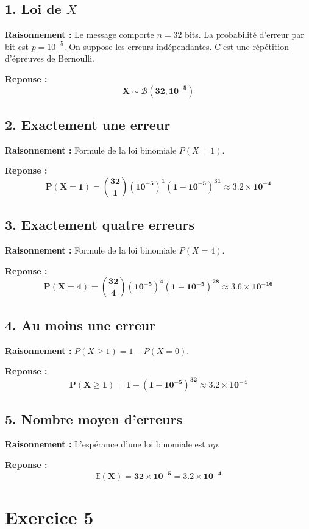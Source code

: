\documentclass[11pt,a4paper]{article}
\begin{document}
\subsection*{1. Loi de $X$}

\textbf{Raisonnement :} Le message comporte $n=32$ bits. La probabilité d'erreur par bit est $p=10^{-5}$. On suppose les erreurs indépendantes. C'est une répétition d'épreuves de Bernoulli.

\textbf{Reponse :} 
$$
\mathbf{X \sim \mathcal{B}(32, 10^{-5})}
$$

\subsection*{2. Exactement une erreur}

\textbf{Raisonnement :} Formule de la loi binomiale $P(X=1)$.

\textbf{Reponse :} 
$$
\mathbf{P(X=1) = \binom{32}{1}(10^{-5})^1(1-10^{-5})^{31} \approx 3.2 \times 10^{-4}}
$$

\subsection*{3. Exactement quatre erreurs}

\textbf{Raisonnement :} Formule de la loi binomiale $P(X=4)$.

\textbf{Reponse :} 
$$
\mathbf{P(X=4) = \binom{32}{4}(10^{-5})^4(1-10^{-5})^{28} \approx 3.6 \times 10^{-16}}
$$

\subsection*{4. Au moins une erreur}

\textbf{Raisonnement :} $P(X \ge 1) = 1 - P(X=0)$.

\textbf{Reponse :} 
$$
\mathbf{P(X \ge 1) = 1 - (1-10^{-5})^{32} \approx 3.2 \times 10^{-4}}
$$

\subsection*{5. Nombre moyen d'erreurs}

\textbf{Raisonnement :} L'espérance d'une loi binomiale est $np$.

\textbf{Reponse :} 
$$
\mathbf{\mathbb{E}(X) = 32 \times 10^{-5} = 3.2 \times 10^{-4}}
$$

\hrulefill

\section*{Exercice 5}
\end{document}
